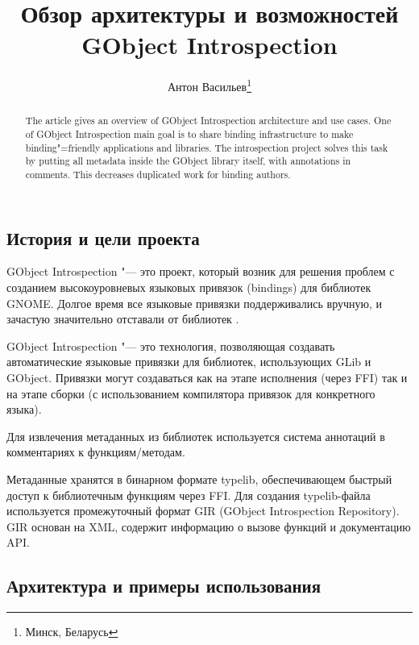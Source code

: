 \documentclass[10pt, a5paper]{article}
\begin{document}
\title{Обзор архитектуры и возможностей GObject Introspection}%

\author{Антон Васильев\footnote{Минск, Беларусь}}
\maketitle

\begin{abstract}
The article gives an overview of GObject Introspection architec\-ture and use cases.
One of GObject Introspection main goal is to share binding infrastructure to make binding"=friendly applications and libraries.
The introspection project solves this task by putting all metadata
inside the GObject library itself, with annotations in comments.
This decreases duplicated work for binding authors.
\end{abstract}

\subsection*{История и цели проекта}
\longpage
GObject Introspection "--- это проект, который возник для решения проблем
с созданием высокоуровневых языковых привязок \linebreak (bindings) для библиотек GNOME. Долгое время все языковые привязки поддерживались вручную, и зачастую значительно отставали от библиотек \cite{Antono1}.

GObject Introspection "--- это технология, позволяющая создавать
автоматические языковые привязки для библиотек, использующих GLib и
GObject.  Привязки могут создаваться как на этапе исполнения (через
FFI) так и на этапе сборки (с использованием компилятора привязок для
конкретного языка).

Для извлечения метаданных из библиотек используется система аннотаций в комментариях к функциям/методам.

Метаданные хранятся в бинарном формате typelib, обеспечивающем
быстрый доступ к библиотечным функциям через FFI. Для создания typelib-файла используется промежуточный формат GIR (GObject Introspection
Repository). GIR основан на XML, содержит информацию о вызове
функций и документацию API.

\subsection*{Архитектура и примеры использования}
\end{document}
